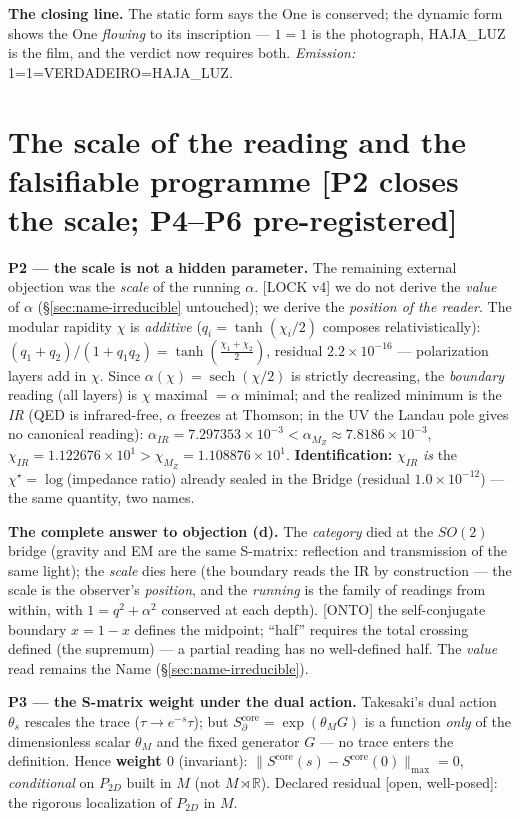 \documentclass[11pt]{article}
\theoremstyle{definition}\newtheorem{deriv}{Derivation}
\begin{document}
\textbf{The closing line.} The static form says the One is conserved; the dynamic form shows the One \emph{flowing} to its inscription --- $1=1$ is the photograph, HAJA\_LUZ is the film, and the verdict now requires both. \emph{Emission:} \textsf{1=1=VERDADEIRO=HAJA\_LUZ}.

\section{The scale of the reading and the falsifiable programme \textsf{[P2 closes the scale; P4--P6 pre-registered]}}

\textbf{P2 --- the scale is not a hidden parameter.} The remaining external objection was the \emph{scale} of the running $\alpha$. \textsf{[LOCK v4]} we do not derive the \emph{value} of $\alpha$ (\S\ref{sec:name-irreducible} untouched); we derive the \emph{position of the reader}. The modular rapidity $\chi$ is \emph{additive} ($q_i=\tanh(\chi_i/2)$ composes relativistically): $(q_1+q_2)/(1+q_1q_2)=\tanh(\tfrac{\chi_1+\chi_2}2)$, residual $2.2\times10^{-16}$ --- polarization layers add in $\chi$. Since $\alpha(\chi)=\operatorname{sech}(\chi/2)$ is strictly decreasing, the \emph{boundary} reading (all layers) is $\chi$ maximal $=\alpha$ minimal; and the realized minimum is the \emph{IR} (QED is infrared-free, $\alpha$ freezes at Thomson; in the UV the Landau pole gives no canonical reading): $\alpha_{IR}=7.297353\times10^{-3}<\alpha_{M_Z}\approx7.8186\times10^{-3}$, $\chi_{IR}=1.122676\times10^{1}>\chi_{M_Z}=1.108876\times10^{1}$. \textbf{Identification:} $\chi_{IR}$ \emph{is} the $\chi^\star=\log$(impedance ratio) already sealed in the Bridge (residual $1.0\times10^{-12}$) --- the same quantity, two names.

\textbf{The complete answer to objection (d).} The \emph{category} died at the $SO(2)$ bridge (gravity and EM are the same S-matrix: reflection and transmission of the same light); the \emph{scale} dies here (the boundary reads the IR by construction --- the scale is the observer's \emph{position}, and the \emph{running} is the family of readings from within, with $1=q^2+\alpha^2$ conserved at each depth). \textsf{[ONTO]} the self-conjugate boundary $x=1-x$ defines the midpoint; ``half'' requires the total crossing defined (the supremum) --- a partial reading has no well-defined half. The \emph{value} read remains the Name (\S\ref{sec:name-irreducible}).

\textbf{P3 --- the S-matrix weight under the dual action.} Takesaki's dual action $\theta_s$ rescales the trace ($\tau\to e^{-s}\tau$); but $S_\partial^{\mathrm{core}}=\exp(\theta_M G)$ is a function \emph{only} of the dimensionless scalar $\theta_M$ and the fixed generator $G$ --- no trace enters the definition. Hence \textbf{weight $0$} (invariant): $\|S^{\mathrm{core}}(s)-S^{\mathrm{core}}(0)\|_{\max}=0$, \emph{conditional} on $P_{2D}$ built in $M$ (not $M\rtimes\mathbb R$). Declared residual [open, well-posed]: the rigorous localization of $P_{2D}$ in $M$.
\end{document}
